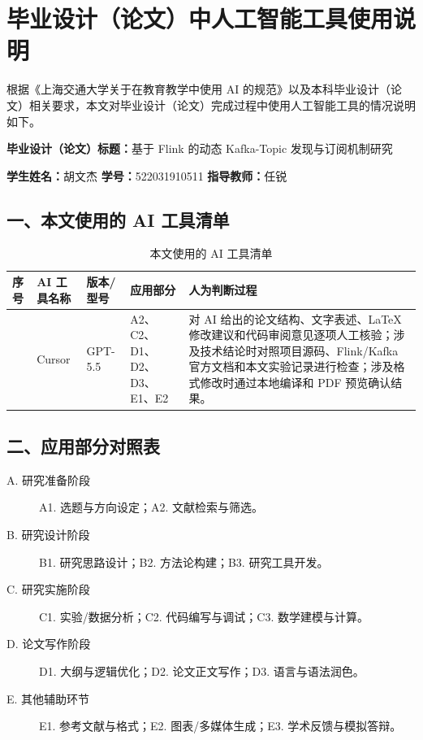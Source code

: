 
\chapter*{毕业设计（论文）中人工智能工具使用说明}

根据《上海交通大学关于在教育教学中使用 AI 的规范》以及本科毕业设计（论文）相关要求，本文对毕业设计（论文）完成过程中使用人工智能工具的情况说明如下。

\noindent\textbf{毕业设计（论文）标题：}基于 Flink 的动态 Kafka-Topic 发现与订阅机制研究

\noindent\textbf{学生姓名：}胡文杰\quad
\textbf{学号：}522031910511\quad
\textbf{指导教师：}任锐

\section*{一、本文使用的 AI 工具清单}

\begin{table}[H]
  \centering
  \caption*{本文使用的 AI 工具清单}
  \small
  \setlength{\tabcolsep}{4pt}
  \renewcommand{\arraystretch}{1.18}
  \begin{tabularx}{0.97\textwidth}{>{\centering\arraybackslash}p{}>{\raggedright\arraybackslash}p{}>{\raggedright\arraybackslash}p{}>{\raggedright\arraybackslash}p{}>{\raggedright\arraybackslash}X}
    \toprule
    序号 & AI 工具名称 & 版本/型号 & 应用部分 & 人为判断过程 \\
    \midrule
    1 & Cursor & GPT-5.5 & A2、C2、D1、D2、D3、E1、E2 &
    对 AI 给出的论文结构、文字表述、LaTeX 修改建议和代码审阅意见逐项人工核验；涉及技术结论时对照项目源码、Flink/Kafka 官方文档和本文实验记录进行检查；涉及格式修改时通过本地编译和 PDF 预览确认结果。 \\
    \bottomrule
  \end{tabularx}
\end{table}

\section*{二、应用部分对照表}

\begin{description}
  \item[A. 研究准备阶段] A1. 选题与方向设定；A2. 文献检索与筛选。
  \item[B. 研究设计阶段] B1. 研究思路设计；B2. 方法论构建；B3. 研究工具开发。
  \item[C. 研究实施阶段] C1. 实验/数据分析；C2. 代码编写与调试；C3. 数学建模与计算。
  \item[D. 论文写作阶段] D1. 大纲与逻辑优化；D2. 论文正文写作；D3. 语言与语法润色。
  \item[E. 其他辅助环节] E1. 参考文献与格式；E2. 图表/多媒体生成；E3. 学术反馈与模拟答辩。
\end{description}

